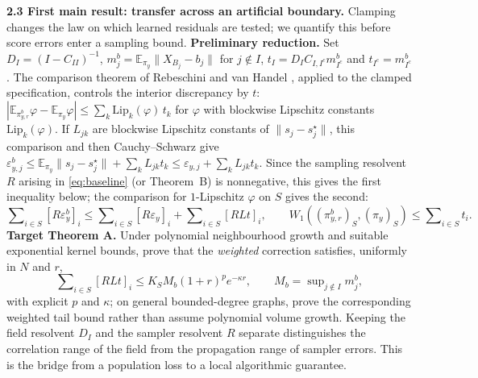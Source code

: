 \documentclass[12pt,a4paper]{article}
\newcommand{\E}{\mathbb E}
\newcommand{\W}{W_1}
\newcommand{\piy}{\pi_y}
\newcommand{\pir}{\pi_{y,r}^{b}}
\newcommand{\epsb}{\varepsilon^{b}_{y}}
\newcommand{\epsy}{\varepsilon_{y}}
\begin{document}
\textbf{2.3 First main result: transfer across an artificial boundary.}
Clamping changes the law on which learned residuals are tested; we quantify this before score errors enter a sampling bound. \textbf{Preliminary reduction.} Set $D_I=(I-C_{II})^{-1}$, $m_j^b=\E_{\piy}\|X_{B_j}-b_j\|$ for $j\notin I$, $t_I=D_I C_{I,I^c}m_{I^c}^b$ and $t_{I^c}=m_{I^c}^b$. The comparison theorem of Rebeschini and van Handel \cite{RvH14}, applied to the clamped specification, controls the interior discrepancy by $t$: $|\E_{\pir}\varphi-\E_{\piy}\varphi|\leq\sum_k\mathrm{Lip}_k(\varphi)\,t_k$ for $\varphi$ with blockwise Lipschitz constants $\mathrm{Lip}_k(\varphi)$. If $L_{jk}$ are blockwise Lipschitz constants of $\|s_j-s_j^\star\|$, this comparison and then Cauchy--Schwarz give $\varepsilon^b_{y,j}\leq\E_{\piy}\|s_j-s_j^\star\|+\sum_kL_{jk}t_k\leq\varepsilon_{y,j}+\sum_kL_{jk}t_k$. Since the sampling resolvent $R$ arising in \eqref{eq:baseline} (or Theorem~B) is nonnegative, this gives the first inequality below; the comparison for $1$-Lipschitz $\varphi$ on $S$ gives the second:
\begin{equation}\label{eq:transfer}
 \sum\nolimits_{i\in S}[R\epsb]_i
 \leq\sum\nolimits_{i\in S}[R\epsy]_i+\sum\nolimits_{i\in S}[RLt]_i,
 \qquad \W((\pir)_S,(\piy)_S)\leq\sum\nolimits_{i\in S}t_i.
\end{equation}
\textbf{Target Theorem A.} Under polynomial neighbourhood growth and suitable exponential kernel bounds, prove that the \emph{weighted} correction satisfies, uniformly in $N$ and $r$,
\begin{equation}\label{eq:thmA}
 \sum\nolimits_{i\in S}[RLt]_i\leq K_SM_b(1+r)^p e^{-\kappa r},\qquad M_b=\sup\nolimits_{j\notin I}m_j^b,
\end{equation}
with explicit $p$ and $\kappa$; on general bounded-degree graphs, prove the corresponding weighted tail bound rather than assume polynomial volume growth. Keeping the field resolvent $D_I$ and the sampler resolvent $R$ separate distinguishes the correlation range of the field from the propagation range of sampler errors. This is the bridge from a population loss to a local algorithmic guarantee.
\end{document}
